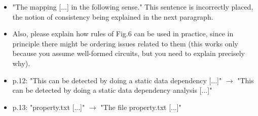 \begin{itemize}
\item 
"The mapping [...] in the following sense." This sentence is incorrectly
placed, the notion of consistency being explained in the next paragraph.


\item Also, please explain how rules of Fig.6 can be used in practice, since in
principle there might be ordering issues related to them (this works only
because you assume well-formed circuits, but you need to explain precisely why).


\item p.12: "This can be detected by doing a static data dependency [...]" $\rightarrow$ "This
can be detected by doing a static data dependency analysis [...]"

\done

\item p.13: "property.txt [...]" $\rightarrow$ "The file property.txt [...]"

\done

\end{itemize}




